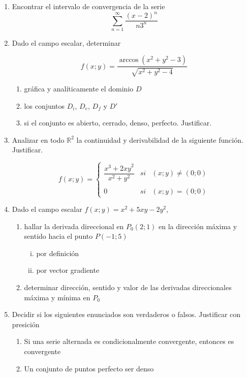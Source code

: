 \documentclass[9pt,a4paper]{extarticle}
\begin{document}
\newpage
{}

\begin{enumerate}
    \item Encontrar el intervalo de convergencia de la serie
    \[
    \sum^\infty_{n=1} \dfrac{{(x-2)}^n}{n3^n}
    \]
    
    
    \item Dado el campo escalar, determinar
    
    \[
    f(x;y)= \dfrac{\arccos(x^2+y^2-3)}{\sqrt{x^2+y^2-4}}
    \]
    
    \begin{enumerate}
        \item gráfica y analíticamente el dominio $D$
        \item los conjuntos $D_i$, $D_e$, $D_f$ y $D'$
        \item si el conjunto es abierto, cerrado, denso, perfecto. Justificar.
    \end{enumerate}
    
    
    \item Analizar en todo ${\mathbb{R}}^2$ la continuidad y derivabilidad  de la siguiente función. Justificar.
    
    \[
    f(x;y)= \left\{ \begin{array}{lcc}
             \dfrac{x^3 + {2xy}^2}{x^2 + y^2} &   si  & (x;y) \neq (0;0) \\
             \\ 0 &  si & (x;y) = (0;0)
             \end{array}
   \right.
    \]
    
    \item Dado el campo escalar $f(x;y)=x^2+5xy-2y^2$, 
    \begin{enumerate}
        \item hallar la derivada direccional en $P_0 (2;1)$ en la dirección máxima y sentido hacia el punto $P (-1;5)$
        \begin{enumerate}[(i)]
            \item por definición
            \item por vector gradiente
        \end{enumerate}
        \item determinar dirección, sentido y valor de las derivadas direccionales máxima y mínima en $P_0$
    \end{enumerate}
    
    \item Decidir si los siguientes enunciados son verdaderos o falsos. Justificar con presición
    \begin{enumerate}
        \item Si una serie alternada es condicionalmente convergente, entonces es convergente
        \item Un conjunto de puntos perfecto ser denso
    \end{enumerate}
    
\end{enumerate}
\end{document}
